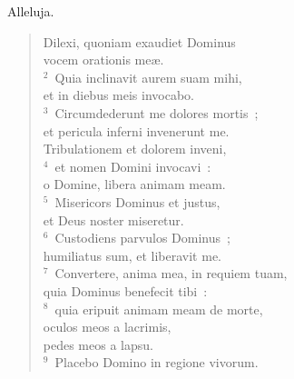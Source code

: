 \lettrine[lines=3,image=true,loversize=0.05,lraise=-0.03]{A}{}lleluja. \begin{flushleft}\begin{verse}\vspace{6pt}Dilexi, quoniam exaudiet Dominus\\ vocem orationis me\ae .\\
${}^{2}$~Quia inclinavit aurem suam mihi,\\ et in diebus meis invocabo.\\
${}^{3}$~Circumdederunt me dolores mortis~;\\ et pericula inferni invenerunt me.\\ Tribulationem et dolorem inveni,\\
${}^{4}$~et nomen Domini invocavi~:\\ o Domine, libera animam meam.\\
${}^{5}$~Misericors Dominus et justus,\\ et Deus noster miseretur.\\
${}^{6}$~Custodiens parvulos Dominus~;\\ humiliatus sum, et liberavit me.\\
${}^{7}$~Convertere, anima mea, in requiem tuam,\\ quia Dominus benefecit tibi~:\\
${}^{8}$~quia eripuit animam meam de morte,\\ oculos meos a lacrimis,\\ pedes meos a lapsu.\\
${}^{9}$~Placebo Domino in regione vivorum.\end{verse}\end{flushleft}



